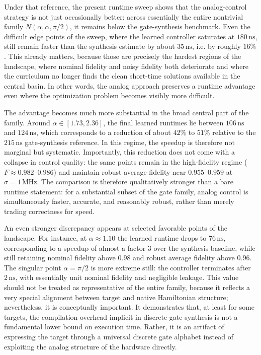 Under that reference, the present runtime sweep shows that the analog-control strategy is not just occasionally
better: across essentially the entire nontrivial family \(N(\alpha,\alpha,\pi/2)\), it remains below the
gate-synthesis benchmark. Even the difficult edge points of the sweep, where the learned controller saturates at
\(180\,\mathrm{ns}\), still remain faster than the synthesis estimate by about \(35\,\mathrm{ns}\), i.e. by roughly
\(16\%\). This already matters, because those are precisely the hardest regions of the landscape, where nominal
fidelity and noisy fidelity both deteriorate and where the curriculum no longer finds the clean short-time solutions
available in the central basin. In other words, the analog approach preserves a runtime advantage even where the
optimization problem becomes visibly more difficult.

The advantage becomes much more substantial in the broad central part of the family. Around
\(\alpha \in [1.73,2.36]\), the final learned runtimes lie between \(106\,\mathrm{ns}\) and \(124\,\mathrm{ns}\),
which corresponds to a reduction of about \(42\%\) to \(51\%\) relative to the \(215\,\mathrm{ns}\) gate-synthesis
reference. In this regime, the speedup is therefore not marginal but systematic. Importantly, this reduction does
not come with a collapse in control quality: the same points remain in the high-fidelity regime
(\(F \approx 0.982\)--\(0.986\)) and maintain robust average fidelity near \(0.955\)--\(0.959\) at
\(\sigma=1\,\mathrm{MHz}\). The comparison is therefore qualitatively stronger than a bare runtime statement:
for a substantial subset of the gate family, analog control is simultaneously faster, accurate, and reasonably
robust, rather than merely trading correctness for speed.

An even stronger discrepancy appears at selected favorable points of the landscape. For instance, at
\(\alpha \approx 1.10\) the learned runtime drops to \(76\,\mathrm{ns}\), corresponding to a speedup of almost a
factor \(3\) over the synthesis baseline, while still retaining nominal fidelity above \(0.98\) and robust average
fidelity above \(0.96\). The singular point \(\alpha=\pi/2\) is more extreme still: the controller terminates after
\(2\,\mathrm{ns}\), with essentially unit nominal fidelity and negligible leakage. This value should not be treated
as representative of the entire family, because it reflects a very special alignment between target and native
Hamiltonian structure; nevertheless, it is conceptually important. It demonstrates that, at least for some targets,
the compilation overhead implicit in discrete gate synthesis is not a fundamental lower bound on execution time.
Rather, it is an artifact of expressing the target through a universal discrete gate alphabet instead of exploiting
the analog structure of the hardware directly.

